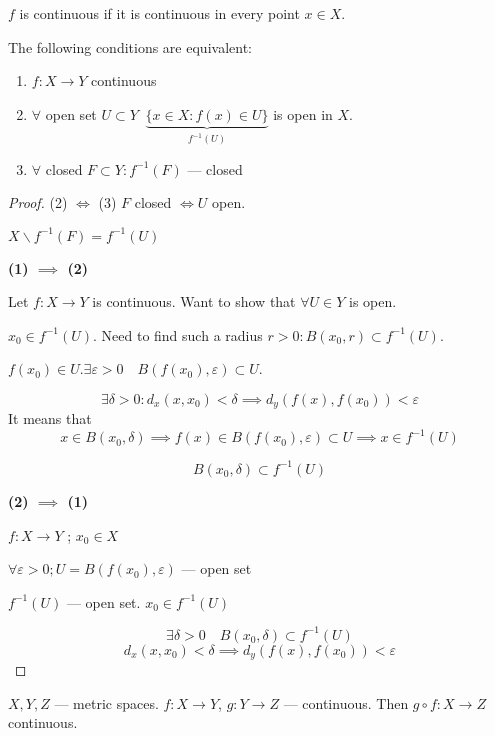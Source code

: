 \begin{definition}
  $f$ is continuous if it is continuous in every point $x \in  X$.
\end{definition}


\begin{theorem}
  The following conditions are equivalent:
  \begin{enumerate}
    \item $f: X \to  Y$ continuous
    \item $\forall$ open set $U \subset Y \;\; \underbrace{\{x \in  X: f(x) \in U\}}_{f^{-1}(U)} $ is open in $X$.
    \item $\forall $ closed $F \subset Y : f^{-1}(F)$  --- closed
  \end{enumerate}
\end{theorem}

\begin{proof}
  (2) $\iff$ (3) $F$ closed $ \iff U$ open.

  $X \backslash f^{-1}(F) = f^{-1}(U)$ 


  \textbf{(1) $\implies$ (2)}

  Let $f: X \to  Y$ is continuous. Want to show that $\forall U \in  Y$ is open.

  $x_0 \in  f^{-1}(U)$. Need to find such a radius $r > 0: B(x_0, r) \subset f^{-1}(U)$.

  $f(x_0) \in  U. \exists \varepsilon>0 \quad B(f(x_0), \varepsilon) \subset U$.

  \[ \exists \delta > 0: d_x(x,x_0) < \delta \implies d_y(f(x),f(x_0)) < \varepsilon \] 
  It means that
  \[ x \in  B(x_0,\delta) \implies f(x) \in  B(f(x_0), \varepsilon) \subset U 
  \implies x \in  f^{-1}(U)\] 

  \[ B(x_0, \delta) \subset f^{-1}(U) \] 


  \textbf{(2) $\implies$ (1)}

  $f: X \to  Y$ ; $x_0 \in  X$


  $\forall \varepsilon > 0; U = B(f(x_0), \varepsilon)$ --- open set

  $f^{-1}(U)$ --- open set. $x_0 \in  f^{-1}(U)$

\[ \exists  \delta > 0 \quad B(x_0,\delta) \subset f^{-1}(U) \] 
\[ d_x(x,x_0) < \delta \implies d_y(f(x),f(x_0)) < \varepsilon \] 

\end{proof}


\begin{corollary}
  $X,Y,Z$ --- metric spaces. $f: X \to  Y$, $g: Y \to Z$ --- continuous.
  Then $g \circ f: X \to Z$ continuous.
\end{corollary}

